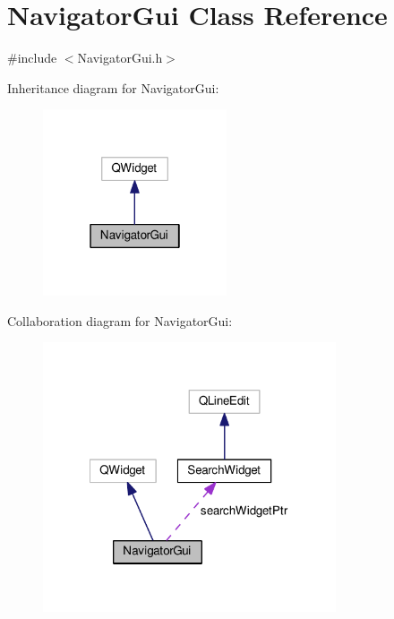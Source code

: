 \hypertarget{class_navigator_gui}{\section{Navigator\-Gui Class Reference}
\label{class_navigator_gui}
}


{\ttfamily \#include $<$Navigator\-Gui.\-h$>$}



Inheritance diagram for Navigator\-Gui\-:
\nopagebreak
\begin{figure}[H]
\begin{center}
\leavevmode
\includegraphics[width=154pt]{class_navigator_gui__inherit__graph}
\end{center}
\end{figure}


Collaboration diagram for Navigator\-Gui\-:
\nopagebreak
\begin{figure}[H]
\begin{center}
\leavevmode
\includegraphics[width=245pt]{class_navigator_gui__coll__graph}
\end{center}
\end{figure}
